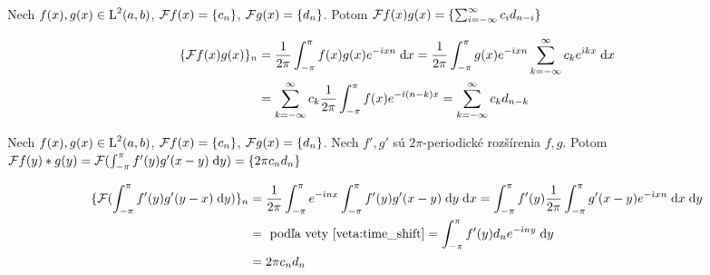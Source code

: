 \begin{veta}[O modulácii]
Nech $f(x),g(x) \in \mbox{L}^2(a,b)$, $\mathcal{F}{f(x)} = \{c_n\}$,
$\mathcal{F}{g(x)} = \{d_n\}$. Potom
$\mathcal{F} f(x)g(x) = \{ \sum_{i=-\infty}^{\infty} c_i d_{n-i} \}$
\end{veta}
\begin{dokaz}
    \begin{equation*}
    \begin{split}
      \{\mathcal{F} f(x)g(x)\}_n &= 
        \frac{1}{2\pi} \int_{-\pi}^{\pi} f(x)g(x) e^{-\hat{\imath} x n} \; \mathrm{d} x 
        = \frac{1}{2\pi} \int_{-\pi}^{\pi} g(x) e^{-\hat{\imath} x n} \sum_{k=-\infty}^{\infty} c_k
        e^{\hat{\imath} k x} \; \mathrm{d} x \\
        &= \sum_{k=-\infty}^{\infty} c_k \frac{1}{2\pi} \int_{-\pi}^{\pi} f(x) e^{-\hat{\imath} (n-k)
        x}
        = \sum_{k=-\infty}^{\infty} c_k d_{n-k}
    \end{split}
    \end{equation*}
\end{dokaz}

\begin{veta}[O konvolúcii]
Nech $f(x),g(x) \in \mbox{L}^2(a,b)$, $\mathcal{F}{f(x)} = \{c_n\}$,
$\mathcal{F}{g(x)} = \{d_n\}$. Nech $f', g'$ sú $2\pi$-periodické
rozšírenia $f,g$. Potom $\mathcal{F} f(y)*g(y) = 
    \mathcal{F} (\int_{-\pi}^{\pi} f'(y)g'(x-y) \; \mathrm{d} y) = \{ 2\pi c_n d_n \}$

\end{veta}
\begin{dokaz}
    \begin{equation*}
    \begin{split}
        \{\mathcal{F} (\int_{-\pi}^{\pi} f'(y)g'(y-x) \; \mathrm{d} y)\}_n 
        &= \frac{1}{2\pi} \int_{-\pi}^{\pi} e^{-\hat{\imath} n x}
            \int_{-\pi}^{\pi} f'(y)g'(x-y) \; \mathrm{d} y \; \mathrm{d} x 
         = \int_{-\pi}^{\pi} f'(y) \frac{1}{2\pi} \int_{-\pi}^{\pi}  g'(x-y) e^{-\hat{\imath} x n}
         \; \mathrm{d} x \; \mathrm{d} y \\
        &=\text{ podľa vety \ref{veta:time_shift}}=
          \int_{-\pi}^{\pi} f'(y) d_{n} e^{-\hat{\imath} n y} \; \mathrm{d} y \\
        &= 2\pi c_n d_n
    \end{split}
    \end{equation*}
\end{dokaz}


